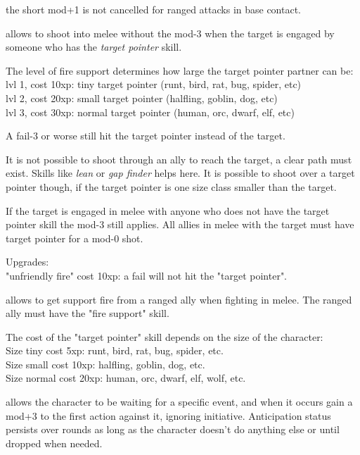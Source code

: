  the short mod+1 is not cancelled for ranged attacks in base contact.


 allows to shoot into melee without the mod-3 when the target is engaged by someone who has the \emph{target pointer} skill.

The level of fire support determines how large the target pointer partner can be:\\
lvl 1, cost 10xp: tiny target pointer (runt, bird, rat, bug, spider, etc) \\
lvl 2, cost 20xp: small target pointer (halfling, goblin, dog, etc) \\
lvl 3, cost 30xp: normal target pointer (human, orc, dwarf, elf, etc)

A fail-3 or worse still hit the target pointer instead of the target.

It is not possible to shoot through an ally to reach the target, a clear path must exist. Skills like \emph{lean} or \emph{gap finder} helps here. It is possible to shoot over a target pointer though, if the target pointer is one size class smaller than the target.

If the target is engaged in melee with anyone who does not have the target pointer skill the mod-3 still applies. All allies in melee with the target must have target pointer for a mod-0 shot.

Upgrades: \\
"unfriendly fire" cost 10xp: a fail will not hit the "target pointer".


 allows to get support fire from a ranged ally when fighting in melee. The ranged ally must have the "fire support" skill.

The cost of the "target pointer" skill depends on the size of the character: \\
Size tiny cost 5xp: runt, bird, rat, bug, spider, etc. \\
Size small cost 10xp: halfling, goblin, dog, etc. \\
Size normal cost 20xp: human, orc, dwarf, elf, wolf, etc.


 allows the character to be waiting for a specific event, and when it occurs gain a mod+3 to the first action against it, ignoring initiative. Anticipation status persists over rounds as long as the character doesn't do anything else or until dropped when needed.

